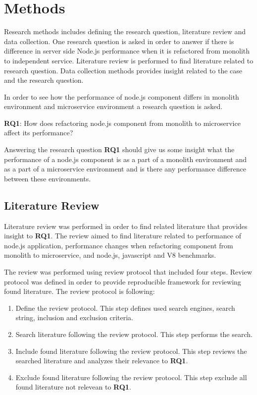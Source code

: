 \chapter{Methods\label{methods}}
Research methods includes defining the research question, literature review and data collection.
One research question is asked in order to answer if there is difference in server side Node.js performance when it is refactored from monolith to independent service.
Literature review is performed to find literature related to research question.
Data collection methods provides insight related to the case and the research question.

In order to see how the performance of node.js component differs in monolith environment and microservice environment a research question is asked.

\textbf{RQ1}: How does refactoring node.js component from monolith to microservice affect its performance?

Answering the research question \textbf{RQ1} should give us some insight what the performance of a node.js component is as a part of a monolith environment and as a part of a microservice environment and is there any performance difference between these environments.

\section{Literature Review}
Literature review was performed in order to find related literature that provides insight to \textbf{RQ1}.
The review aimed to find literature related to performance of node.js application, performance changes when refactoring component from monolith to microservice, and node.js, javascript and V8 benchmarks.

The review was performed using review protocol that included four steps.
Review protocol was defined in order to provide reproducible framework for reviewing found literature.
The review protocol is following:
\begin{enumerate}
    \item Define the review protocol. This step defines used search engines, search string, inclusion and exclusion criteria.
    \item Search literature following the review protocol. This step performs the search.
    \item Include found literature following the review protocol. This step reviews the searched literature and analyzes their relevance to \textbf{RQ1}.
    \item Exclude found literature following the review protocol. This step exclude all found literature not relevean to \textbf{RQ1}.
\end{enumerate}

